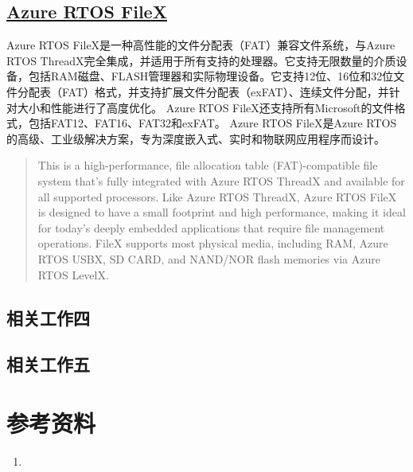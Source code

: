 \documentclass[UTF8,a4paper]{ctexart}
\begin{document}
\subsection{\href{https://github.com/azure-rtos/filex}{Azure RTOS FileX}}
	Azure RTOS FileX是一种高性能的文件分配表（FAT）兼容文件系统，与Azure RTOS ThreadX完全集成，并适用于所有支持的处理器。它支持无限数量的介质设备，包括RAM磁盘、FLASH管理器和实际物理设备。它支持12位、16位和32位文件分配表（FAT）格式，并支持扩展文件分配表（exFAT）、连续文件分配，并针对大小和性能进行了高度优化。
	Azure RTOS FileX还支持所有Microsoft的文件格式，包括FAT12、FAT16、FAT32和exFAT。
	Azure RTOS FileX是Azure RTOS的高级、工业级解决方案，专为深度嵌入式、实时和物联网应用程序而设计。
	\begin{quote}
		This is a high-performance, file allocation table (FAT)-compatible file system that’s fully integrated with Azure RTOS ThreadX and available for all supported processors. Like Azure RTOS ThreadX, Azure RTOS FileX is designed to have a small footprint and high performance, making it ideal for today’s deeply embedded applications that require file management operations. FileX supports most physical media, including RAM, Azure RTOS USBX, SD CARD, and NAND/NOR flash memories via Azure RTOS LevelX.
	\end{quote}
\subsection{相关工作四}
\subsection{相关工作五}

\section{参考资料}
\begin{enumerate}
    \item 
    
\end{enumerate}
\end{document}
